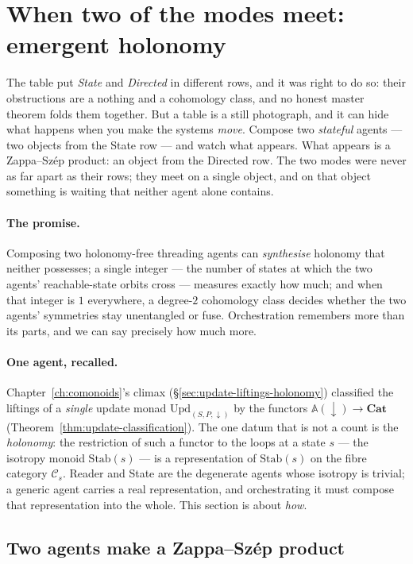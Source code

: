 \documentclass[11pt,a4paper]{book}
\newcommand{\Cat}{\mathbf{Cat}}
\theoremstyle{plain}
\theoremstyle{definition}
\theoremstyle{remark}
\begin{document}
\section{When two of the modes meet: emergent holonomy}
\label{sec:emergent-holonomy}

The table put \emph{State} and \emph{Directed} in different rows, and it was right to do
so: their obstructions are a nothing and a cohomology class, and no honest master theorem
folds them together. But a table is a still photograph, and it can hide what happens
when you make the systems \emph{move}. Compose two \emph{stateful} agents --- two
objects from the State row --- and watch what appears. What appears is a
Zappa--Sz\'ep product: an object from the Directed row. The two modes were never as
far apart as their rows; they meet on a single object, and on that object something is
waiting that neither agent alone contains.

\paragraph{The promise.} Composing two holonomy-free threading agents can
\emph{synthesise} holonomy that neither possesses; a single integer --- the number of
states at which the two agents' reachable-state orbits cross --- measures exactly how
much; and when that integer is $1$ everywhere, a degree-$2$ cohomology class decides
whether the two agents' symmetries stay unentangled or fuse. Orchestration remembers
more than its parts, and we can say precisely how much more.

\paragraph{One agent, recalled.} Chapter~\ref{ch:comonoids}'s climax
(\S\ref{sec:update-liftings-holonomy}) classified the liftings of a \emph{single}
update monad $\mathrm{Upd}_{(S,P,\downarrow)}$ by the functors
$\mathbb A(\downarrow)\to\Cat$ (Theorem~\ref{thm:update-classification}). The one datum
that is not a count is the \emph{holonomy}: the restriction of such a functor to the
loops at a state $s$ --- the isotropy monoid $\mathrm{Stab}(s)$ --- is a representation
of $\mathrm{Stab}(s)$ on the fibre category $\mathcal C_{s}$. Reader and State are the
degenerate agents whose isotropy is trivial; a generic agent carries a real
representation, and orchestrating it must compose that representation into the whole.
This section is about \emph{how}.

\subsection*{Two agents make a Zappa--Sz\'ep product}
\end{document}
